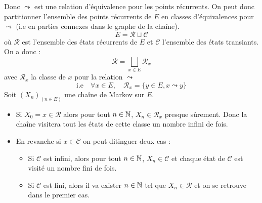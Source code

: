 \begin{proposition}
    Donc $ \leadsto$ est une relation d'équivalence pour les points récurrents. On peut donc partitionner l'ensemble 
    des points récurrents de $E$ en classes d'équivalences pour $ \leadsto$ (i.e en parties connexes dans le graphe de la chaîne). 
        \[ E = \mathcal{R} \sqcup \mathcal{C} \]
    où $ \mathcal{R}$ est l'ensemble des états récurrents de $E$ et $ \mathcal{C}$ l'ensemble des états transiants. 
    On a donc : 
        \[ \mathcal{R} = \bigsqcup_{x \in E} \mathcal{R}_x    \]
    avec $ \mathcal{R}_x$ la classe de $x$ pour la relation $\leadsto$ 
        \[ \text{i.e} \quad \forall x \in E, \quad \mathcal{R} _x = \{y \in E, x \leadsto y \}  \] 
    Soit $(X_n)_(n \in E)$ une chaîne de Markov sur $E$. 
        \begin{itemize}
            \item Si $X_0 = x \in \mathcal{R}$ alors pour tout $n \in \mathbb{N}$, $X_n \in \mathcal{R}_x$ presque sûrement. 
            Donc la chaîne visitera tout les états de cette classe un nombre infini de fois. 
            \item En revanche si $x \in \mathcal{C}$ on peut ditinguer deux cas : 
            \begin{itemize}
                \item Si $ \mathcal{C}$ est infini, alors pour tout $n \in \mathbb{N}$, $X_n \in \mathcal{C}$ et chaque état 
                de $ \mathcal{C}$ est visité un nombre fini de fois. 
                \item Si $ \mathcal{C}$ est fini, alors il va exister $n \in \mathbb{N}$ tel que $ X_n \in \mathcal{ R}$ 
                et on se retrouve dans le premier cas.   
            \end{itemize}
        \end{itemize}
\end{proposition}

